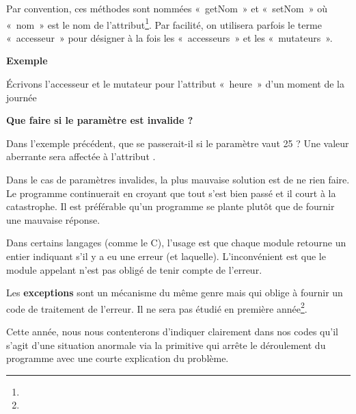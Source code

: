 Par convention, ces méthodes sont nommées «~getNom~» et «~setNom~» où
«~nom~» est le nom de
l'attribut\footnote{}. Par facilité, on utilisera parfois le terme «~accesseur~»
pour désigner à la fois les «~accesseurs~» et les «~mutateurs~».

{\bfseries
Exemple}

Écrivons l'accesseur et le mutateur pour
l'attribut «~heure~» d'un moment de
la journée


\bigskip


\bigskip

{\sffamily\bfseries\upshape
Que faire si le paramètre est invalide ? }

Dans l'exemple précédent, que se passerait-il si le
paramètre  vaut 25 ? Une valeur aberrante sera
affectée à l'attribut .

Dans le cas de paramètres invalides, la plus mauvaise solution est de ne
rien faire. Le programme continuerait en croyant que tout s’est bien
passé et il court à la catastrophe. Il est préférable qu’un programme
se plante plutôt que de fournir une mauvaise réponse. 

Dans certains langages (comme le C), l’usage est que chaque module
retourne un entier indiquant s'il y a eu une erreur
(et laquelle). L’inconvénient est que le module appelant n’est pas
obligé de tenir compte de l’erreur.

Les \textbf{exceptions} sont un mécanisme du même genre mais qui oblige
à fournir un code de traitement de l’erreur. Il ne sera pas étudié en
première année\footnote{}.

Cette année, nous nous contenterons d'indiquer
clairement dans nos codes qu'il
s'agit d'une situation anormale via
la primitive  qui arrête le déroulement du
programme avec une courte explication du problème.

